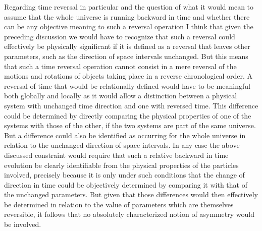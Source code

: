 \documentclass[notitlepage,12pt]{report}
\begin{document}
Regarding time reversal in particular and the question of what it would mean to assume that the whole universe is running backward in time and whether there can be any objective meaning to such a reversal operation I think that given the preceding discussion we would have to recognize that such a reversal could effectively be physically significant if it is defined as a reversal that leaves other parameters, such as the direction of space intervals unchanged. But this means that such a time reversal operation cannot consist in a mere reversal of the motions and rotations of objects taking place in a reverse chronological order. A reversal of time that would be relationally defined would have to be meaningful both globally and locally as it would allow a distinction between a physical system with unchanged time direction and one with reversed time. This difference could be determined by directly comparing the physical properties of one of the systems with those of the other, if the two systems are part of the same universe. But a difference could also be identified as occurring for the whole universe in relation to the unchanged direction of space intervals. In any case the above discussed constraint would require that such a relative backward in time evolution be clearly identifiable from the physical properties of the particles involved, precisely because it is only under such conditions that the change of direction in time could be objectively determined by comparing it with that of the unchanged parameters. But given that those differences would then effectively be determined in relation to the value of parameters which are themselves reversible, it follows that no absolutely characterized notion of asymmetry would be involved.
\end{document}

